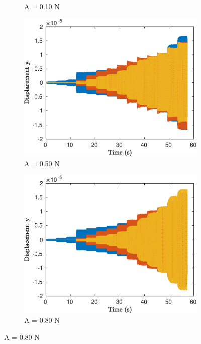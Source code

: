 \documentclass[aspectratio=169]{beamer}
\begin{document}
\begin{frame}[allowframebreaks]
\begin{figure}[!h]
\begin{subfigure}[!h]{0.2\linewidth}
      \caption{A = 0.10 N}     
    \end{subfigure}%
    \begin{subfigure}[!h]{0.2\linewidth}
      \includegraphics[width=\linewidth]{../../benchmark4/FIGURES/TDOMPERF_PNLSS_PLL_famp05_nx23}
      \caption{A = 0.50 N}      
    \end{subfigure}%
    \begin{subfigure}[!h]{0.2\linewidth}
      \includegraphics[width=\linewidth]{../../benchmark4/FIGURES/TDOMPERF_PNLSS_PLL_famp08_nx23}
      \caption{A = 0.80 N}      
    \end{subfigure}%

\end{figure}
\end{frame}
\end{document}
